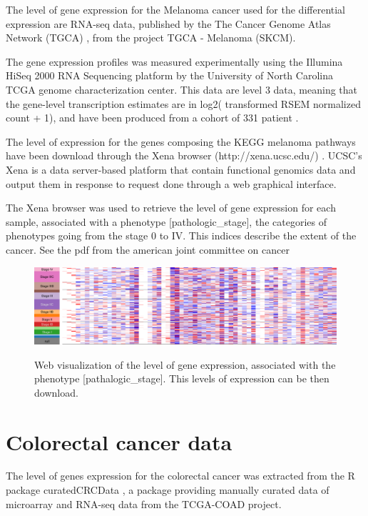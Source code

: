 \documentclass[a4paper,12pt]{report}
\begin{document}
The level of gene expression for the Melanoma cancer used for the differential expression are RNA-seq data, published by the The Cancer Genome Atlas Network (TGCA) \cite{TGCA}, from the project TGCA - Melanoma (SKCM).

The gene expression profiles was measured experimentally using the Illumina HiSeq 2000 RNA Sequencing platform by the University of North Carolina TCGA genome characterization center. This data are level 3 data, meaning that the gene-level transcription estimates are in log2( transformed RSEM normalized count + 1), and have been produced from a cohort of 331 patient \cite{TGCA}.

The level of expression for the genes composing the KEGG melanoma pathways have been download through the Xena browser (http://xena.ucsc.edu/) \cite{Xena}. UCSC's Xena is a data server-based platform that contain functional genomics data and output them in response to request done through a web graphical interface. 

The Xena browser was used to retrieve the level of gene expression for each sample, associated with a phenotype [pathologic\_stage], the categories of phenotypes going from the stage 0 to IV. This indices describe the extent of the cancer. See the pdf from the american joint committee on cancer \cite{joint}


\begin{figure}[H]
	\centering
	{\includegraphics[width=1\textwidth]{Xena_melanoma.pdf}}
	\caption{Web visualization of the level of gene expression, associated with the phenotype [pathalogic\_stage]. This levels of expression can be then download.}
\end{figure}

\section{Colorectal cancer data}

The level of genes expression for the colorectal cancer was extracted from the R package curatedCRCData \cite{curated}, a package providing manually curated data of microarray and RNA-seq data from the TCGA-COAD project.
\end{document}
